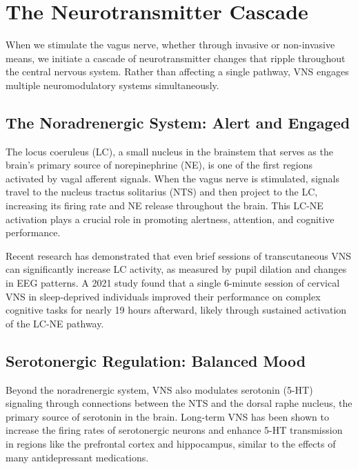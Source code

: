 \documentclass[
  Letterpaper,
]{scrbook}
\begin{document}
\section{The Neurotransmitter
Cascade}\label{the-neurotransmitter-cascade}

When we stimulate the vagus nerve, whether through invasive or
non-invasive means, we initiate a cascade of neurotransmitter changes
that ripple throughout the central nervous system. Rather than affecting
a single pathway, VNS engages multiple neuromodulatory systems
simultaneously.

\subsection{The Noradrenergic System: Alert and
Engaged}\label{the-noradrenergic-system-alert-and-engaged}

The locus coeruleus (LC), a small nucleus in the brainstem that serves
as the brain's primary source of norepinephrine (NE), is one of the
first regions activated by vagal afferent signals. When the vagus nerve
is stimulated, signals travel to the nucleus tractus solitarius (NTS)
and then project to the LC, increasing its firing rate and NE release
throughout the brain. This LC-NE activation plays a crucial role in
promoting alertness, attention, and cognitive performance.

Recent research has demonstrated that even brief sessions of
transcutaneous VNS can significantly increase LC activity, as measured
by pupil dilation and changes in EEG patterns. A 2021 study found that a
single 6-minute session of cervical VNS in sleep-deprived individuals
improved their performance on complex cognitive tasks for nearly 19
hours afterward, likely through sustained activation of the LC-NE
pathway.

\subsection{Serotonergic Regulation: Balanced
Mood}\label{serotonergic-regulation-balanced-mood}

Beyond the noradrenergic system, VNS also modulates serotonin (5-HT)
signaling through connections between the NTS and the dorsal raphe
nucleus, the primary source of serotonin in the brain. Long-term VNS has
been shown to increase the firing rates of serotonergic neurons and
enhance 5-HT transmission in regions like the prefrontal cortex and
hippocampus, similar to the effects of many antidepressant medications.
\end{document}
